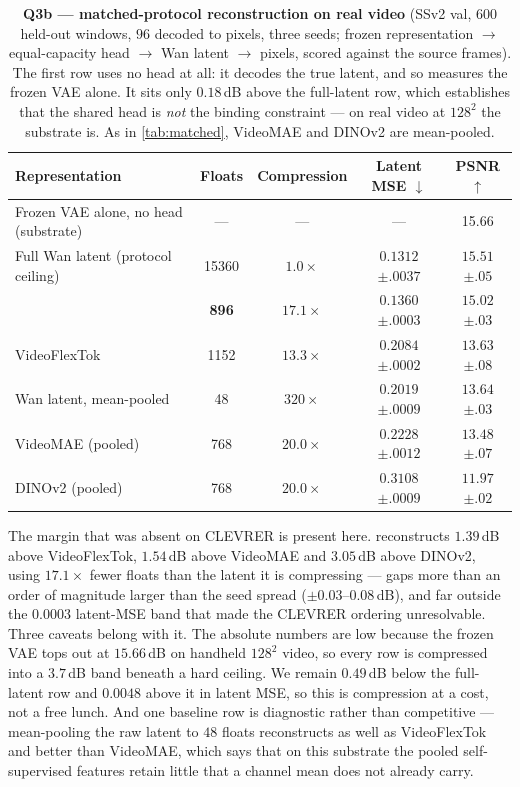 \begin{table}[t]
\centering\small
\caption{\textbf{Q3b --- matched-protocol reconstruction on real video} (SSv2 val, $600$
held-out windows, $96$ decoded to pixels, three seeds; frozen representation $\to$ equal-capacity head
$\to$ Wan latent $\to$ pixels, scored against the source frames). The first row uses no
head at all: it decodes the true latent, and so measures the frozen VAE alone. It sits
only $0.18$\,dB above the full-latent row, which establishes that the shared head is
\emph{not} the binding constraint --- on real video at $128^2$ the substrate is. As in
\cref{tab:matched}, VideoMAE and DINOv2 are mean-pooled.}
\label{tab:ssv2recon}
\begin{tabular}{lcccc}
\toprule
Representation & Floats & Compression & Latent MSE $\downarrow$ & PSNR $\uparrow$ \\
\midrule
Frozen VAE alone, no head (substrate) & --- & --- & --- & 15.66 \\
Full Wan latent (protocol ceiling) & 15360 & $1.0\times$ & $0.1312${\tiny$\pm.0037$} & $15.51${\tiny$\pm.05$} \\
\midrule
\textbf{\method{}} & \textbf{896} & $\mathbf{17.1\times}$ & $\mathbf{0.1360}${\tiny$\pm.0003$} & $\mathbf{15.02}${\tiny$\pm.03$} \\
VideoFlexTok \citep{videoflextok} & 1152 & $13.3\times$ & $0.2084${\tiny$\pm.0002$} & $13.63${\tiny$\pm.08$} \\
Wan latent, mean-pooled & 48 & $320\times$ & $0.2019${\tiny$\pm.0009$} & $13.64${\tiny$\pm.03$} \\
VideoMAE \citep{videomae} (pooled) & 768 & $20.0\times$ & $0.2228${\tiny$\pm.0012$} & $13.48${\tiny$\pm.07$} \\
DINOv2 \citep{dinov2} (pooled) & 768 & $20.0\times$ & $0.3108${\tiny$\pm.0009$} & $11.97${\tiny$\pm.02$} \\
\bottomrule
\end{tabular}
\end{table}

The margin that was absent on CLEVRER is present here. \method{} reconstructs
$1.39$\,dB above VideoFlexTok, $1.54$\,dB above VideoMAE and $3.05$\,dB above DINOv2,
using $17.1\times$ fewer floats than the latent it is compressing --- gaps more than an
order of magnitude larger than the seed spread ($\pm0.03$--$0.08$\,dB), and far outside
the $0.0003$ latent-MSE band that made the CLEVRER ordering unresolvable. Three caveats
belong with it. The absolute numbers are low because the frozen VAE tops out at
$15.66$\,dB on handheld $128^2$ video, so every row is compressed into a $3.7$\,dB band
beneath a hard ceiling. We remain $0.49$\,dB below the full-latent row and $0.0048$ above
it in latent MSE, so this is compression at a cost, not a free lunch. And one baseline row
is diagnostic rather than competitive --- mean-pooling the raw latent to $48$ floats
reconstructs as well as VideoFlexTok and better than VideoMAE, which says that on this
substrate the pooled self-supervised features retain little that a channel mean does not
already carry.

